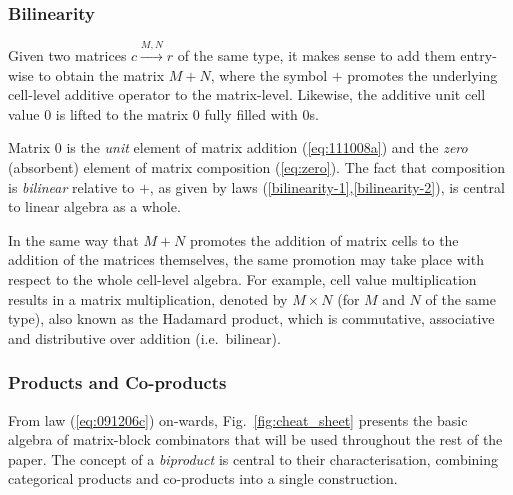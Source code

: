 \documentclass[sigplan,screen]{acmart}
\def\doc{paper}
\begin{document}
\subsubsection{Bilinearity}
Given two matrices $c \xrightarrow{M, N} r$ of the same type, it makes sense to add them entry-wise to obtain the matrix $M+N$, where the symbol $+$ promotes the underlying cell-level additive operator to the matrix-level. Likewise, the additive unit cell value $0$ is lifted to the matrix $0$ fully filled with $0$s.

Matrix $0$ is the \emph{unit} element of matrix addition (\ref{eq:111008a}) and the \emph{zero} (absorbent) element of matrix composition (\ref{eq:zero}).
The fact that composition is \emph{bilinear} relative to $+$, as given by laws (\ref{bilinearity-1},\ref{bilinearity-2}), is central to linear algebra as a whole.

In the same way that $M + N$ promotes the addition of matrix cells to the addition of the matrices themselves, the same promotion may take place with respect to the whole cell-level algebra. For example, cell value multiplication results in a matrix multiplication, denoted by $M \times N$
(for $M$ and $N$ of the same type), also known as the Hadamard product, which is commutative, associative and distributive over addition (i.e.\ bilinear).

\subsubsection{Products and Co-products}\label{laop-laws}

From law (\ref{eq:091206c}) on-wards, Fig.~\ref{fig:cheat_sheet} presents the basic algebra of matrix-block combinators that will be used throughout the rest of the \doc. The concept of a \emph{biproduct} is central to their characterisation,
combining categorical products and co-products into a single construction.
\end{document}
